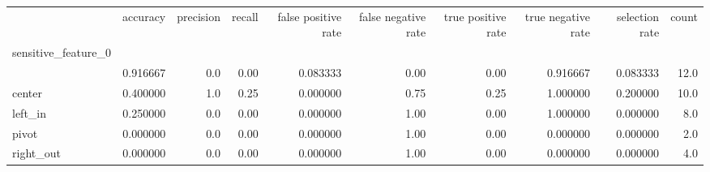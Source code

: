 \begin{tabular}{lrrrrrrrrr}
\toprule
{} &  accuracy &  precision &  recall &  false positive rate &  false negative rate &  true positive rate &  true negative rate &  selection rate &  count \\
sensitive\_feature\_0 &           &            &         &                      &                      &                     &                     &                 &        \\
\midrule
                    &  0.916667 &        0.0 &    0.00 &             0.083333 &                 0.00 &                0.00 &            0.916667 &        0.083333 &   12.0 \\
center              &  0.400000 &        1.0 &    0.25 &             0.000000 &                 0.75 &                0.25 &            1.000000 &        0.200000 &   10.0 \\
left\_in             &  0.250000 &        0.0 &    0.00 &             0.000000 &                 1.00 &                0.00 &            1.000000 &        0.000000 &    8.0 \\
pivot               &  0.000000 &        0.0 &    0.00 &             0.000000 &                 1.00 &                0.00 &            0.000000 &        0.000000 &    2.0 \\
right\_out           &  0.000000 &        0.0 &    0.00 &             0.000000 &                 1.00 &                0.00 &            0.000000 &        0.000000 &    4.0 \\
\bottomrule
\end{tabular}

